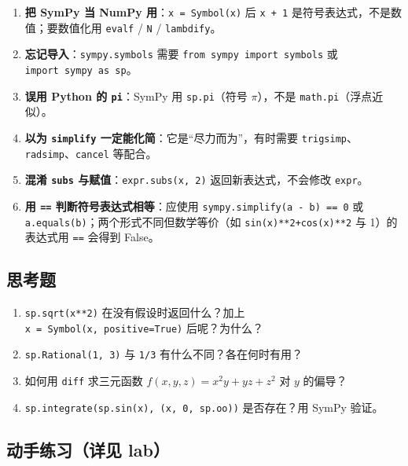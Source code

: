 \begin{enumerate}
\def\labelenumi{\arabic{enumi}.}
\tightlist
\item
  \textbf{把 SymPy 当 NumPy
  用}：\texttt{x\ =\ Symbol(\textquotesingle{}x\textquotesingle{})} 后
  \texttt{x\ +\ 1} 是符号表达式，不是数值；要数值化用 \texttt{evalf} /
  \texttt{N} / \texttt{lambdify}。
\item
  \textbf{忘记导入}：\texttt{sympy.symbols} 需要
  \texttt{from\ sympy\ import\ symbols} 或
  \texttt{import\ sympy\ as\ sp}。
\item
  \textbf{误用 Python 的 \texttt{pi}}：SymPy 用 \texttt{sp.pi}（符号
  \(\pi\)），不是 \texttt{math.pi}（浮点近似）。
\item
  \textbf{以为 \texttt{simplify} 一定能化简}：它是``尽力而为''，有时需要
  \texttt{trigsimp}、\texttt{radsimp}、\texttt{cancel} 等配合。
\item
  \textbf{混淆 \texttt{subs} 与赋值}：\texttt{expr.subs(x,\ 2)}
  返回新表达式，不会修改 \texttt{expr}。
\item
  \textbf{用 \texttt{==} 判断符号表达式相等}：应使用
  \texttt{sympy.simplify(a\ -\ b)\ ==\ 0} 或
  \texttt{a.equals(b)}；两个形式不同但数学等价（如
  \texttt{sin(x)**2+cos(x)**2} 与 1）的表达式用 \texttt{==} 会得到
  False。
\end{enumerate}

\subsection{思考题}\label{ux601dux8003ux9898-7}

\begin{enumerate}
\def\labelenumi{\arabic{enumi}.}
\tightlist
\item
  \texttt{sp.sqrt(x**2)} 在没有假设时返回什么？加上
  \texttt{x\ =\ Symbol(\textquotesingle{}x\textquotesingle{},\ positive=True)}
  后呢？为什么？
\item
  \texttt{sp.Rational(1,\ 3)} 与 \texttt{1/3} 有什么不同？各在何时有用？
\item
  如何用 \texttt{diff} 求三元函数 \(f(x,y,z)=x^2y+yz+z^2\) 对 \(y\)
  的偏导？
\item
  \texttt{sp.integrate(sp.sin(x),\ (x,\ 0,\ sp.oo))} 是否存在？用 SymPy
  验证。
\end{enumerate}

\subsection{动手练习（详见
lab）}\label{ux52a8ux624bux7ec3ux4e60ux8be6ux89c1-lab-4}

